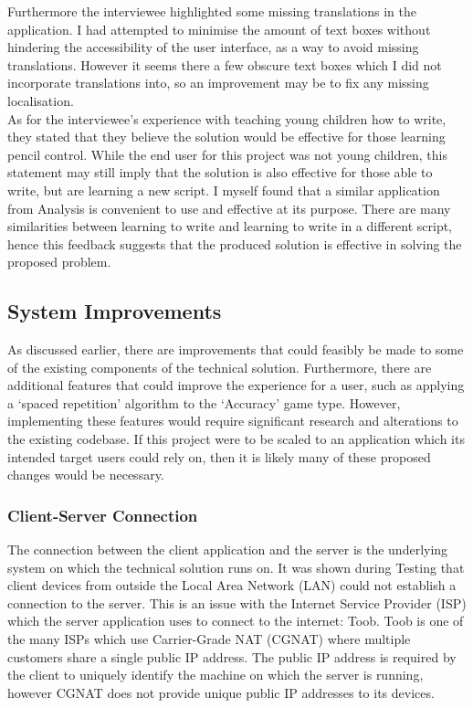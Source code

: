 \documentclass{article}
\begin{document}
Furthermore the interviewee highlighted some missing translations in the application. I had attempted to minimise the amount of text boxes without hindering the accessibility of the user interface, as a way to avoid missing translations. However it seems there a few obscure text boxes which I did not incorporate translations into, so an improvement may be to fix any missing localisation. \\

As for the interviewee's experience with teaching young children how to write, they stated that they believe the solution would be effective for those learning pencil control. While the end user for this project was not young children, this statement may still imply that the solution is also effective for those able to write, but are learning a new script. I myself found that a similar application from Analysis is convenient to use and effective at its purpose. There are many similarities between learning to write and learning to write in a different script, hence this feedback suggests that the produced solution is effective in solving the proposed problem.

\subsection{System Improvements}

As discussed earlier, there are improvements that could feasibly be made to some of the existing components of the technical solution. Furthermore, there are additional features that could improve the experience for a user, such as applying a `spaced repetition' algorithm to the `Accuracy' game type. However, implementing these features would require significant research and alterations to the existing codebase. If this project were to be scaled to an application which its intended target users could rely on, then it is likely many of these proposed changes would be necessary.

\subsubsection{Client-Server Connection}

The connection between the client application and the server is the underlying system on which the technical solution runs on. It was shown during Testing that client devices from outside the Local Area Network (LAN) could not establish a connection to the server. This is an issue with the Internet Service Provider (ISP) which the server application uses to connect to the internet: Toob. Toob is one of the many ISPs which use Carrier-Grade NAT (CGNAT) where multiple customers share a single public IP address. The public IP address is required by the client to uniquely identify the machine on which the server is running, however CGNAT does not provide unique public IP addresses to its devices. \\
\end{document}
